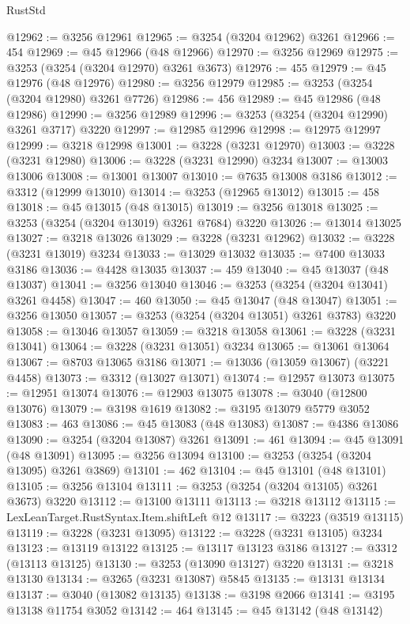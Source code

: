 \begin{lexlean}{RustStd}
\begin{coremodule}
@12962 := @3256 @12961
@12965 := @3254 (@3204 @12962) @3261
@12966 := 454
@12969 := @45 @12966 (@48 @12966)
@12970 := @3256 @12969
@12975 := @3253 (@3254 (@3204 @12970) @3261 @3673)
@12976 := 455
@12979 := @45 @12976 (@48 @12976)
@12980 := @3256 @12979
@12985 := @3253 (@3254 (@3204 @12980) @3261 @7726)
@12986 := 456
@12989 := @45 @12986 (@48 @12986)
@12990 := @3256 @12989
@12996 := @3253 (@3254 (@3204 @12990) @3261 @3717) @3220
@12997 := @12985 @12996
@12998 := @12975 @12997
@12999 := @3218 @12998
@13001 := @3228 (@3231 @12970)
@13003 := @3228 (@3231 @12980)
@13006 := @3228 (@3231 @12990) @3234
@13007 := @13003 @13006
@13008 := @13001 @13007
@13010 := @7635 @13008 @3186
@13012 := @3312 (@12999 @13010)
@13014 := @3253 (@12965 @13012)
@13015 := 458
@13018 := @45 @13015 (@48 @13015)
@13019 := @3256 @13018
@13025 := @3253 (@3254 (@3204 @13019) @3261 @7684) @3220
@13026 := @13014 @13025
@13027 := @3218 @13026
@13029 := @3228 (@3231 @12962)
@13032 := @3228 (@3231 @13019) @3234
@13033 := @13029 @13032
@13035 := @7400 @13033 @3186
@13036 := @4428 @13035
@13037 := 459
@13040 := @45 @13037 (@48 @13037)
@13041 := @3256 @13040
@13046 := @3253 (@3254 (@3204 @13041) @3261 @4458)
@13047 := 460
@13050 := @45 @13047 (@48 @13047)
@13051 := @3256 @13050
@13057 := @3253 (@3254 (@3204 @13051) @3261 @3783) @3220
@13058 := @13046 @13057
@13059 := @3218 @13058
@13061 := @3228 (@3231 @13041)
@13064 := @3228 (@3231 @13051) @3234
@13065 := @13061 @13064
@13067 := @8703 @13065 @3186
@13071 := @13036 (@13059 @13067) (@3221 @4458)
@13073 := @3312 (@13027 @13071)
@13074 := @12957 @13073
@13075 := @12951 @13074
@13076 := @12903 @13075
@13078 := @3040 (@12800 @13076)
@13079 := @3198 @1619
@13082 := @3195 @13079 @5779 @3052
@13083 := 463
@13086 := @45 @13083 (@48 @13083)
@13087 := @4386 @13086
@13090 := @3254 (@3204 @13087) @3261
@13091 := 461
@13094 := @45 @13091 (@48 @13091)
@13095 := @3256 @13094
@13100 := @3253 (@3254 (@3204 @13095) @3261 @3869)
@13101 := 462
@13104 := @45 @13101 (@48 @13101)
@13105 := @3256 @13104
@13111 := @3253 (@3254 (@3204 @13105) @3261 @3673) @3220
@13112 := @13100 @13111
@13113 := @3218 @13112
@13115 := LexLeanTarget.RustSyntax.Item.shiftLeft @12
@13117 := @3223 (@3519 @13115)
@13119 := @3228 (@3231 @13095)
@13122 := @3228 (@3231 @13105) @3234
@13123 := @13119 @13122
@13125 := @13117 @13123 @3186
@13127 := @3312 (@13113 @13125)
@13130 := @3253 (@13090 @13127) @3220
@13131 := @3218 @13130
@13134 := @3265 (@3231 @13087) @5845
@13135 := @13131 @13134
@13137 := @3040 (@13082 @13135)
@13138 := @3198 @2066
@13141 := @3195 @13138 @11754 @3052
@13142 := 464
@13145 := @45 @13142 (@48 @13142)

\end{coremodule}
\end{lexlean}
